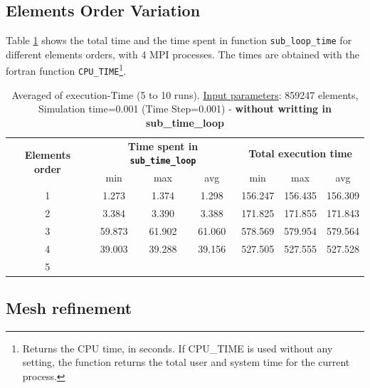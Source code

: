\documentclass[10pt,twoside]{article}   	%
\begin{document}
\subsection{Elements Order Variation}

Table \ref{tab:5} shows the total time and the time spent in function \texttt{sub\_loop\_time} for different elements orders, with 4 MPI processes. The times are obtained with the fortran function \texttt{CPU\_TIME}\footnote{Returns the CPU time, in seconds. If CPU\_TIME is used without any setting, the function returns the total user and system time for the current process.}. 


\begin{table}[ht!]
\centering
\caption{Averaged of execution-Time (5 to 10 runs). {\underline{Input parameters}}: 859247 elements,  Simulation time=0.001 (Time Step=0.001) - {\bf{without writting in sub\_time\_loop}}}
{\small
\begin{tabular}{|c|c|c|c|c|c|c|} \hline 
\multirow{2}{*}{ {{\bf{Elements order}}} }	& \multicolumn{3}{c|}{ {{\bf{Time spent in \texttt{sub\_time\_loop}  }}} }	& \multicolumn{3}{c|}{  {{\bf{Total execution time}}} }\\ 
										&   		min & max & avg							& 	min & max & avg			\\ \hline \hline
 		1		                 				& 1.273 & 1.374 & 1.298								& 156.247  & 156.435 &  156.309	\\ \hline
 		2		                 				& 3.384	&  3.390  & 3.388							&  171.825 & 171.855 & 171.843		\\ \hline
 		3		                 				& 59.873 	 &  61.902	& 61.060							&  578.569 & 579.954 & 579.564 	\\ \hline
		 4		                 				& 39.003	& 39.288  & 39.156							& 527.505  & 527.555 & 527.528		\\ \hline
		5		                 				& 	&  &											&  	 & 	& 		\\ \hline
\end{tabular}
}
\label{tab:5}
\end{table}



\subsection{Mesh refinement}
\end{document}
